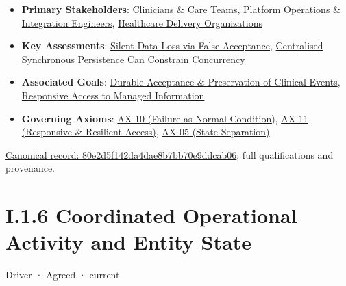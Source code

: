 \begin{itemize}


\item \textbf{Primary Stakeholders}: \href{\detokenize{../../../../../docs/markdown/01-motivation/stakeholders/enterprise-stakeholders.md}}{Clinicians \& Care Teams}, \href{\detokenize{../../../../../docs/markdown/01-motivation/stakeholders/enterprise-stakeholders.md}}{Platform Operations \& Integration Engineers}, \href{\detokenize{../../../../../docs/markdown/01-motivation/stakeholders/enterprise-stakeholders.md}}{Healthcare Delivery Organizations}

\item \textbf{Key Assessments}: \href{\detokenize{../../../../../docs/markdown/01-motivation/drivers-assessments/assessments.md}}{Silent Data Loss via False Acceptance}, \href{\detokenize{../../../../../docs/markdown/01-motivation/drivers-assessments/assessments.md}}{Centralised Synchronous Persistence Can Constrain Concurrency}

\item \textbf{Associated Goals}: \href{\detokenize{../../../../../docs/markdown/01-motivation/goals-outcomes/strategic-goals.md}}{Durable Acceptance \& Preservation of Clinical Events}, \href{\detokenize{../../../../../docs/markdown/01-motivation/goals-outcomes/strategic-goals.md}}{Responsive Access to Managed Information}

\item \textbf{Governing Axioms}: \hyperref[element:0d9673833eb840eab03804aa076c1b0c]{AX-10 (Failure as Normal Condition)}, \hyperref[element:8a1e995f16954484a78ae1c5c114d546]{AX-11 (Responsive \& Resilient Access)}, \hyperref[element:0412a2084f0145babc4f022c71fea65f]{AX-05 (State Separation)}

\end{itemize}

{\footnotesize \href{../../../../continuum/motivation/driver/80e2d5f142da4dae8b7bb70e9ddcab06.md}{Canonical record: 80e2d5f142da4dae8b7bb70e9ddcab06}; full qualifications and provenance.}\par
\section*{I.1.6 Coordinated Operational Activity and Entity State}
\label{navigation:I.1.6}

\label{element:b3fb294d95024e4382b2c251c389fa66}
{\small Driver · Agreed · current}\par


